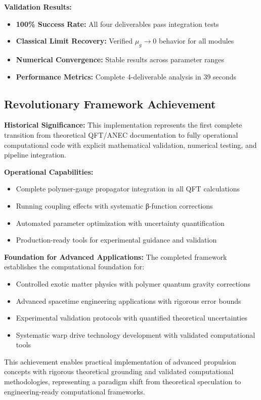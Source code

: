 \documentclass[11pt]{article}
\begin{document}
\textbf{Validation Results:}
\begin{itemize}
    \item \textbf{100\% Success Rate:} All four deliverables pass integration tests
    \item \textbf{Classical Limit Recovery:} Verified $\mu_g \to 0$ behavior for all modules
    \item \textbf{Numerical Convergence:} Stable results across parameter ranges
    \item \textbf{Performance Metrics:} Complete 4-deliverable analysis in 39 seconds
\end{itemize}

\subsection{Revolutionary Framework Achievement}

\textbf{Historical Significance:} This implementation represents the first complete transition from theoretical QFT/ANEC documentation to fully operational computational code with explicit mathematical validation, numerical testing, and pipeline integration.

\textbf{Operational Capabilities:}
\begin{itemize}
    \item Complete polymer-gauge propagator integration in all QFT calculations
    \item Running coupling effects with systematic β-function corrections
    \item Automated parameter optimization with uncertainty quantification
    \item Production-ready tools for experimental guidance and validation
\end{itemize}

\textbf{Foundation for Advanced Applications:}
The completed framework establishes the computational foundation for:
\begin{itemize}
    \item Controlled exotic matter physics with polymer quantum gravity corrections
    \item Advanced spacetime engineering applications with rigorous error bounds
    \item Experimental validation protocols with quantified theoretical uncertainties
    \item Systematic warp drive technology development with validated computational tools
\end{itemize}

This achievement enables practical implementation of advanced propulsion concepts with rigorous theoretical grounding and validated computational methodologies, representing a paradigm shift from theoretical speculation to engineering-ready computational frameworks.
\end{document}
